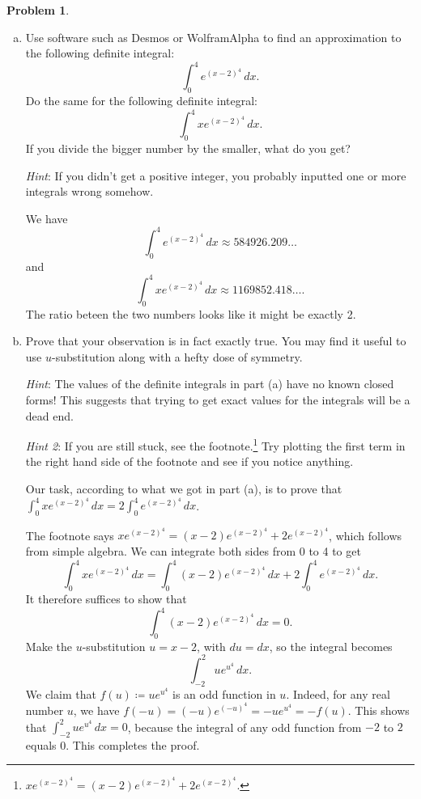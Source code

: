 \documentclass[11pt,oneside]{amsart}
\theoremstyle{definition}
\newtheorem{problem}{Problem}
\begin{document}
    \begin{problem}
        \leavevmode
        \begin{enumerate}[(a)]
            \item Use software such as Desmos or WolframAlpha to find an approximation to the following definite integral:
            \[\int_0^4e^{(x-2)^4}\,dx.\]
            Do the same for the following definite integral:
            \[\int_0^4 xe^{(x-2)^4}\,dx.\]
            If you divide the bigger number by the smaller, what do you get?

            \emph{Hint}: If you didn't get a positive integer, you probably inputted one or more integrals wrong somehow.
            \begin{solution}
                We have
                \[\int_0^4e^{(x-2)^4}\,dx\approx 584926.209\dots\]
                and
                \[\int_0^4 xe^{(x-2)^4}\,dx\approx 1169852.418\dots.\]
                The ratio beteen the two numbers looks like it might be exactly 2.
            \end{solution}
            \item Prove that your observation is in fact exactly true. You may find it useful to use $u$-substitution along with a hefty dose of symmetry.
            
            \emph{Hint}: The values of the definite integrals in part (a) have no known closed forms! This suggests that trying to get exact values for the integrals will be a dead end.

            \emph{Hint 2}: If you are still stuck, see the footnote.\footnote{$xe^{(x-2)^4}=(x-2)e^{(x-2)^4}+2e^{(x-2)^4}$.} Try plotting the first term in the right hand side of the footnote and see if you notice anything.
            \begin{solution}
                Our task, according to what we got in part (a), is to prove that $\int_0^4 xe^{(x-2)^4}\,dx=2\int_0^4 e^{(x-2)^4}\,dx$.

                The footnote says $xe^{(x-2)^4}=(x-2)e^{(x-2)^4}+2e^{(x-2)^4}$, which follows from simple algebra. We can integrate both sides from 0 to 4 to get
                \[\int_0^4 xe^{(x-2)^4}\,dx = \int_0^4 (x-2)e^{(x-2)^4}\,dx + 2\int_0^4 e^{(x-2)^4}\,dx.\]
                It therefore suffices to show that
                \[\int_0^4 (x-2)e^{(x-2)^4}\,dx=0.\]
                Make the $u$-substitution $u=x-2$, with $du=dx$, so the integral becomes
                \[\int_{-2}^2 ue^{u^4}\,dx.\]
                We claim that $f(u)\coloneqq ue^{u^4}$ is an odd function in $u$. Indeed, for any real number $u$, we have $f(-u)=(-u)e^{(-u)^4}=-ue^{u^4}=-f(u)$. This shows that $\int_{-2}^2 ue^{u^4}\,dx=0$, because the integral of any odd function from $-2$ to $2$ equals 0. This completes the proof.
            \end{solution}
        \end{enumerate}
    \end{problem}
\end{document}
